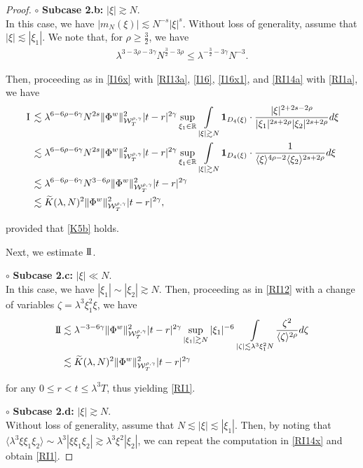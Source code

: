 \documentclass[letterpaper, 11pt,  reqno]{amsart}
\DeclareMathOperator*{\intt}{\int}
\newcommand{\1}{\hspace{0.5mm}\text{I}\hspace{0.5mm}}
\newcommand{\II}{\text{I \hspace{-2.8mm} I} }
\newcommand{\noi}{\noindent}
\newcommand{\R}{\mathbb{R}}
\newcommand{\g}{\gamma}
\newcommand{\ld}{\lambda}
\newcommand{\wt}{\widetilde}
\newcommand{\les}{\lesssim}
\newcommand{\ges}{\gtrsim}
\newcommand{\jb}[1]
{\langle #1 \rangle}
\newcommand{\ind}{\mathbf 1}
\newcommand{\W}{\mathcal{W}}
\newcommand{\z}{\zeta}
\numberwithin{equation}{section}
\numberwithin{theorem}{section}
\begin{document}
\begin{proof}
\medskip


\noi
$\circ$ {\bf Subcase 2.b:}  $|\xi| \ges N$.\\
\indent
In this case, we have   $|m_N(\xi)| \les  N^{-s} |\xi|^{s}$.
Without loss of generality, assume that $|\xi|\les |\xi_1|$.
We note that, for $\rho \ge \frac 32$, we have 
\begin{align}
\ld^{3- 3\rho-3\g} N^{\frac 32 - 3\rho}
\le
\ld^{ - \frac 32  - 3\g} N^{-3}.
\label{RI14a}
\end{align}

\noi
Then, 
proceeding as in \eqref{I16x}
with 
 \eqref{RI13a}, 
\eqref{I16}, 
\eqref{I16x1}, 
and 
\eqref{RI14a} with \eqref{RI1a}, we have
\begin{align}
\begin{split}
\1
&\les 
\ld^{6-  6\rho  - 6\g}N^{2s }
\| \Phi^{w} \|^2_{\W_{T}^{\rho, \g}} 
|t-r|^{2\g} 
\sup_{\xi_1 \in \R}
\intt_{|\xi|\ges N}
\ind_{D_4(\xi)}\cdot
\frac{|\xi|^{2+2s-2\rho} }{|\xi_1|^{2s+2\rho}|\xi_2|^{2s+2\rho}}d\xi \\
&\les 
\ld^{6-  6\rho  - 6\g}N^{2s }
\| \Phi^{w} \|^2_{\W_{T}^{\rho, \g}} 
|t-r|^{2\g} 
\sup_{\xi_1 \in \R}
\intt_{|\xi|\ges N}
\ind_{D_4(\xi)}\cdot
\frac{1 }{\jb{\xi}^{4\rho - 2}\jb{\xi_2}^{2s+2\rho}}d\xi \\
 &\les 
\ld^{6-6\rho -6\g}N^{3-6\rho }
 \| \Phi^{w} \|^2_{\W_{T}^{\rho, \g}}  
|t-r|^{2\g}\\
 &\les 
\wt K(\ld, N)^2
 \| \Phi^{w} \|^2_{\W_{T}^{\rho, \g}}  
|t-r|^{2\g}, 
\end{split}
\label{RI14x}
\end{align}

\noi
provided that 
  \eqref{K5b} holds.




\medskip

Next, we  estimate $\II$.


\medskip

\noi
$\circ$ {\bf Subcase 2.c:}  $|\xi| \ll N$.\\
\indent
In this case, we have 
  $|\xi_1|\sim |\xi_2|\ges N$.
Then, proceeding as in \eqref{RI12}
with 
a change of variables $\z = \ld^3 \xi_1^2 \xi$, we have 
\begin{align*}
\II
& \les 
\ld^{-3- 6\g}
 \| \Phi^{w} \|^2_{\W_{T}^{\rho, \g}}  
|t-r|^{2\g}
\sup_{|\xi_1|\ges N}|\xi_1|^{-6}
\intt_{ |\z|\les \ld^3 \xi_1^2N } \frac{\z^{2}}{\jb{\z}^{2\rho}}d \z\\
 &\les 
\wt K(\ld, N)^2
 \| \Phi^{w} \|^2_{\W_{T}^{\rho, \g}}  
|t-r|^{2\g}
\end{align*}

\noi
for any $0\leq r<t\leq \ld^3T$, 
thus yielding \eqref{RI1}.




\medskip

\noi
$\circ$ {\bf Subcase 2.d:}  $|\xi| \ges N$.\\
\indent
Without loss of generality, assume that $N \les |\xi| \les |\xi_1|$.
Then, by noting
that $\jb{\ld^3 \xi \xi_1 \xi_2} \sim 
\ld^3 |\xi \xi_1 \xi_2|
\ges \ld^3 \xi^2 |\xi_2|$, 
we can repeat the computation in \eqref{RI14x}
and obtain \eqref{RI1}.
\end{proof}
\end{document}
